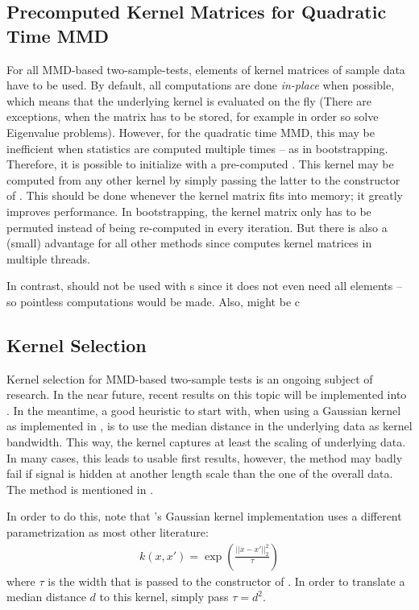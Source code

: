 \subsection{Precomputed Kernel Matrices for Quadratic Time MMD}
\label{sec:quadratic_mmd_precomputed_kernel}
For all MMD-based two-sample-tests, elements of kernel matrices of sample data have to be used. By default, all computations are done \emph{in-place} when possible, which means that the underlying kernel is evaluated on the fly (There are exceptions, when the matrix has to be stored, for example in order so solve Eigenvalue problems). However, for the quadratic time MMD, this may be inefficient when statistics are computed multiple times -- as in bootstrapping. Therefore, it is possible to initialize  with a pre-computed . This kernel may be computed from any other kernel by simply passing the latter to the constructor of . This should be done whenever the kernel matrix fits into memory; it greatly improves performance. In bootstrapping, the kernel matrix only has to be permuted instead of being re-computed in every iteration. But there is also a (small) advantage for all other methods since \shogun{} computes kernel matrices in multiple threads.

In contrast,  should not be used with s since it does not even need all elements -- so pointless computations would be made. Also,  might be c

\subsection{Kernel Selection}
\label{sec:statistical_tests-mmd-kernel_selection}
Kernel selection for MMD-based two-sample tests is an ongoing subject of research. In the near future, recent results on this topic will be implemented into \shogun{}. In the meantime, a good heuristic to start with, when using a Gaussian kernel as implemented in , is to use the median distance in the underlying data as kernel bandwidth. This way, the kernel captures at least the scaling of underlying data. In many cases, this leads to usable first results, however, the method may badly fail if signal is hidden at another length scale than the one of the overall data. The method is mentioned in \citep[Appendix C]{Gretton2012}.

In order to do this, note that  \shogun{}'s Gaussian kernel implementation uses a different parametrization as most other literature:
\begin{align*}
k(x,x')=\exp\left( \frac{||x-x'||_2^2}{\tau}\right)
\end{align*}
where $\tau$ is the width that is passed to the constructor of . In order to translate a median distance $d$ to this kernel, simply pass $\tau=d^2$.

